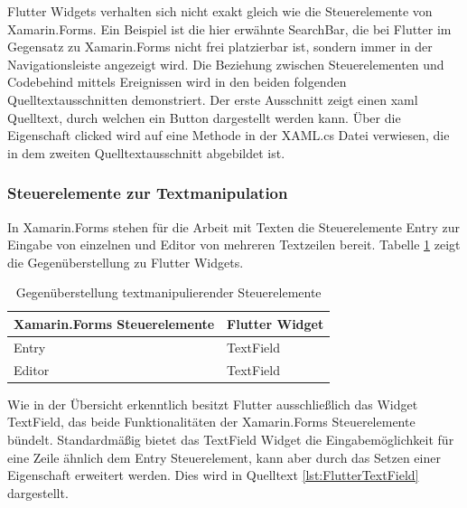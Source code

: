 Flutter Widgets verhalten sich nicht exakt gleich wie die Steuerelemente von Xamarin.Forms.  Ein Beispiel ist die hier erwähnte SearchBar, die bei Flutter im Gegensatz zu Xamarin.Forms nicht frei platzierbar ist, sondern immer in der Navigationsleiste angezeigt wird. 
 \newpage
Die Beziehung zwischen Steuerelementen und Codebehind mittels Ereignissen wird  in den beiden folgenden Quelltextausschnitten demonstriert.  Der erste Ausschnitt zeigt  einen \ac{xaml} Quelltext,  durch welchen ein Button dargestellt werden kann.  Über die Eigenschaft \glq clicked\grq{} wird auf eine Methode in der XAML.cs Datei verwiesen,  die in dem zweiten Quelltextausschnitt abgebildet ist. 





\subsubsection{Steuerelemente zur Textmanipulation}
In Xamarin.Forms stehen für die Arbeit mit Texten die Steuerelemente \glq Entry\grq{} zur  Eingabe von einzelnen und  \glq Editor\grq{} von mehreren Textzeilen bereit.  Tabelle \ref{tab:TextWidgets} zeigt die Gegenüberstellung zu Flutter Widgets.  

\begin{table}[!ht]
\begin{tabularx}{\textwidth}{|X|X|}
\hline
   \textbf{Xamarin.Forms Steuerelemente} & \textbf{Flutter Widget}  \\
\hline
	Entry		       		&  TextField	 		\\ 
	Editor		       	&  TextField	 		\\ 
\hline
\end{tabularx}
\caption{Gegenüberstellung textmanipulierender Steuerelemente}
 \label{tab:TextWidgets}
\end{table}
Wie in der Übersicht erkenntlich besitzt Flutter ausschließlich das Widget \glq TextField\grq{},  das beide Funktionalitäten der Xamarin.Forms Steuerelemente bündelt.  Standardmäßig bietet das \glq TextField\grq{} Widget die Eingabemöglichkeit für eine Zeile ähnlich dem \glq Entry\grq{} Steuerelement, kann aber durch das Setzen einer Eigenschaft erweitert werden.  Dies wird in Quelltext \ref{lst:FlutterTextField} dargestellt.

